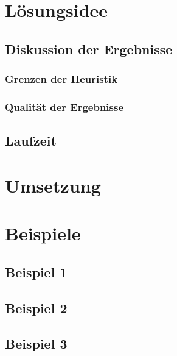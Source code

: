 \documentclass[a4paper,10pt,ngerman]{scrartcl}
\begin{document}
\section{Lösungsidee}










\subsection{Diskussion der Ergebnisse}
\subsubsection{Grenzen der Heuristik}
\subsubsection{Qualität der Ergebnisse}

\subsection{Laufzeit}

\section{Umsetzung}\label{sec:umsetzung}

\section{Beispiele}
\subsection{Beispiel 1}\label{ex:1}
\subsection{Beispiel 2}\label{ex:2}
\subsection{Beispiel 3}\label{ex:3}
\end{document}
